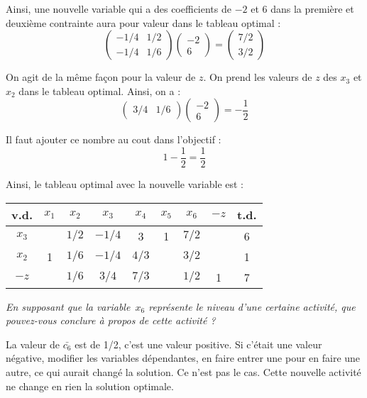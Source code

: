 Ainsi, une nouvelle variable qui a des coefficients de $-2$ et 6 dans la première et deuxième contrainte aura pour valeur dans le tableau optimal :
\[
\begin{pmatrix}
	-1/4 & 1/2 \\
	-1/4 & 1/6
\end{pmatrix}
\begin{pmatrix}
	-2 \\
	6
\end{pmatrix}
=
\begin{pmatrix}
	7/2 \\
	3/2
\end{pmatrix}
\]

On agit de la même façon pour la valeur de $z$. On prend les valeurs de $z$ des $x_3$ et $x_2$ dans le tableau optimal. Ainsi, on a :
\[
\begin{pmatrix}
3/4 & 1/6 
\end{pmatrix}
\begin{pmatrix}
-2 \\
6
\end{pmatrix}
=
-\frac{1}{2}
\]

Il faut ajouter ce nombre au cout dans l’objectif :
\[1 -\frac{1}{2} = \frac{1}{2}\]

Ainsi, le tableau optimal avec la nouvelle variable est :

\begin{center}
	\renewcommand{\arraystretch}{1.5}
	\begin{tabular}{|c|ccccccc|c|}
		\hline
		 v.d.   & $x_{1}$ & $x_{2}$ & $x_{3}$ & $x_{4}$ & $x_{5}$ & $x_{6}$ & $-z$ & t.d. \\ \hline
		$x_{3}$ &         &  $1/2$  & $- 1/4$ &    3    &    1    &  $7/2$  &      &  6   \\
		$x_{2}$ &    1    &  $1/6$  & $- 1/4$ &  $4/3$  &         &  $3/2$  &      &  1   \\ \hline
		 $-z$   &         &  $1/6$  &  $3/4$  &  $7/3$  &         &  $1/2$  &  1   &  7   \\ \hline
	\end{tabular}
\end{center}

\emph{En supposant que la variable~$x_6$ représente le niveau d’une certaine activité, que pouvez-vous conclure à propos de cette activité ?}

La valeur de $\bar{c_6}$ est de 1/2, c’est une valeur positive. Si c’était une valeur négative, modifier les variables dépendantes, en faire entrer une pour en faire une autre, ce qui aurait changé la solution. Ce n’est pas le cas. Cette nouvelle activité ne change en rien la solution optimale.
